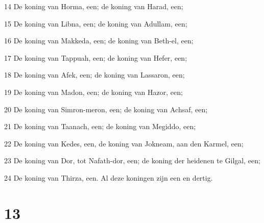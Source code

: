 \par 14 De koning van Horma, een; de koning van Harad, een;
\par 15 De koning van Libna, een; de koning van Adullam, een;
\par 16 De koning van Makkeda, een; de koning van Beth-el, een;
\par 17 De koning van Tappuah, een; de koning van Hefer, een;
\par 18 De koning van Afek, een; de koning van Lassaron, een;
\par 19 De koning van Madon, een; de koning van Hazor, een;
\par 20 De koning van Simron-meron, een; de koning van Achsaf, een;
\par 21 De koning van Taanach, een; de koning van Megiddo, een;
\par 22 De koning van Kedes, een, de koning van Jokneam, aan den Karmel, een;
\par 23 De koning van Dor, tot Nafath-dor, een; de koning der heidenen te Gilgal, een;
\par 24 De koning van Thirza, een. Al deze koningen zijn een en dertig.

\chapter{13}

